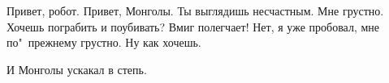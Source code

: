 \begin{dialog}
\X Привет, робот.
\R Привет, Монголы.
\X Ты выглядишь несчастным.
\R Мне грустно.
\X Хочешь пограбить и поубивать? Вмиг полегчает!
\R Нет, я уже пробовал, мне по"~прежнему грустно.
\X Ну как хочешь.
\end{dialog}

\begin{monolog}
И Монголы ускакал в степь.
\end{monolog}
